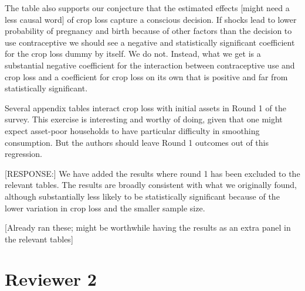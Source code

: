 \documentclass[letterpaper,12pt]{article}
\begin{document}
\begin{description}
The table also supports our conjecture that the estimated effects 
[might need a less causal word] 
of crop loss capture a conscious decision. 
If shocks lead to lower probability of pregnancy and birth because
of other factors than the decision to use contraceptive we should see
a negative and statistically significant coefficient for the crop loss
dummy by itself.
We do not.
Instead, what we get is a substantial negative coefficient for the interaction
between contraceptive use and crop loss and a coefficient for crop loss 
on its own that is positive and far from statistically significant.


\item Several appendix tables interact crop loss with initial assets in
Round 1 of the survey. This exercise is interesting and worthy of doing,
given that one might expect asset-poor households to have particular
difficulty in smoothing consumption. But the authors should leave Round
1 outcomes out of this regression.

[RESPONSE:] We have added the results where round 1 has been excluded
to the relevant tables.
The results are broadly consistent with what we originally found, 
although substantially less likely to be statistically significant 
because of the lower variation in crop loss and the smaller sample
size.

[Already ran these; might be worthwhile having the results as an extra
panel in the relevant tables]


\end{description}



\newpage

\section*{Reviewer 2}

\end{document}
